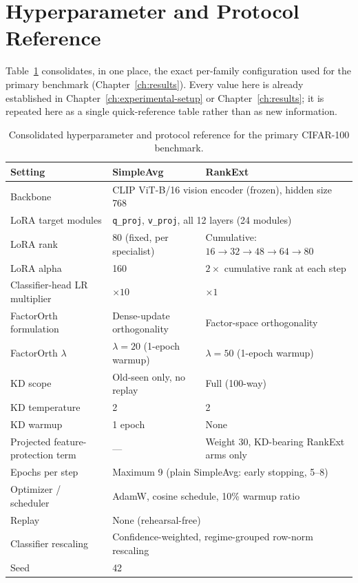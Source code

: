 \section{Hyperparameter and Protocol Reference}
\label{sec:appA-hyperparameters}

Table~\ref{tab:appA-hyperparams} consolidates, in one place, the exact
per-family configuration used for the primary benchmark
(Chapter~\ref{ch:results}). Every value here is already established in
Chapter~\ref{ch:experimental-setup} or Chapter~\ref{ch:results}; it is
repeated here as a single quick-reference table rather than as new
information.

\begin{table}[htbp]
\centering
\begin{tabularx}{\textwidth}{@{}X X X@{}}
\toprule
\textbf{Setting} & \textbf{SimpleAvg} & \textbf{RankExt} \\
\midrule
Backbone & \multicolumn{2}{l}{CLIP ViT-B/16 vision encoder (frozen), hidden size 768} \\
LoRA target modules & \multicolumn{2}{l}{\texttt{q\_proj}, \texttt{v\_proj}, all 12 layers (24 modules)} \\
LoRA rank & 80 (fixed, per specialist) & Cumulative: $16{\to}32{\to}48{\to}64{\to}80$ \\
LoRA alpha & 160 & $2\times$ cumulative rank at each step \\
Classifier-head LR multiplier & $\times10$ & $\times1$ \\
FactorOrth formulation & Dense-update orthogonality & Factor-space orthogonality \\
FactorOrth $\lambda$ & $\lambda=20$ (1-epoch warmup) & $\lambda=50$ (1-epoch warmup) \\
KD scope & Old-seen only, no replay & Full (100-way) \\
KD temperature & 2 & 2 \\
KD warmup & 1 epoch & None \\
Projected feature-protection term & --- & Weight 30, KD-bearing RankExt arms only \\
Epochs per step & \multicolumn{2}{l}{Maximum 9 (plain SimpleAvg: early stopping, 5--8)} \\
Optimizer / scheduler & \multicolumn{2}{l}{AdamW, cosine schedule, 10\% warmup ratio} \\
Replay & \multicolumn{2}{l}{None (rehearsal-free)} \\
Classifier rescaling & \multicolumn{2}{l}{Confidence-weighted, regime-grouped row-norm rescaling} \\
Seed & \multicolumn{2}{l}{42} \\
\bottomrule
\end{tabularx}
\caption[Hyperparameter reference]{Consolidated hyperparameter and protocol
reference for the primary CIFAR-100 benchmark.}
\label{tab:appA-hyperparams}
\end{table}

